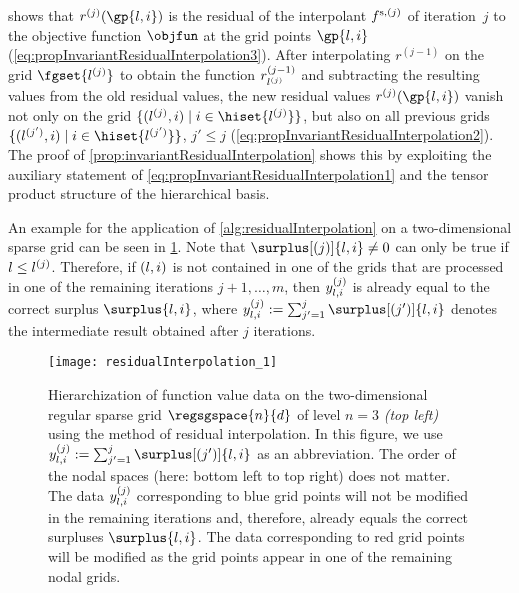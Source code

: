  shows that
$r^{(j)}(\gp{\*l,\*i})$ is the residual of the
interpolant $f^{\mathrm{s},(j)}$ of iteration~$j$
to the objective function $\objfun$ at the grid points $\gp{\*l,\*i}$
(\cref{eq:propInvariantResidualInterpolation3}).
After interpolating $r^{(j-1)}$ on the grid $\fgset{\*l^{(j)}}$
to obtain the function $r_{\*l^{(j)}}^{(j-1)}$
and subtracting the resulting values from the old residual values,
the new residual values $r^{(j)}(\gp{\*l,\*i})$ vanish
not only on the grid $\{(\*l^{(j)}, \*i) \mid \*i \in \hiset{\*l^{(j)}}\}$,
but also on all previous grids
$\{(\*l^{(j')}, \*i) \mid \*i \in \hiset{\*l^{(j')}}\}$, $j' \le j$
(\cref{eq:propInvariantResidualInterpolation2}).
The proof of \cref{prop:invariantResidualInterpolation}
shows this by exploiting the auxiliary statement of
\cref{eq:propInvariantResidualInterpolation1}
and the tensor product structure of the hierarchical basis.

An example for the application of \cref{alg:residualInterpolation}
on a two-dimensional sparse grid can be seen in
\cref{fig:residualInterpolation}.
Note that
$\surplus[(j)]{\*l,\*i} \not= 0$ can only be true if $\*l \le \*l^{(j)}$.
Therefore, if $(\*l, \*i)$ is not contained in one of the
grids that are processed in one of the remaining iterations $j+1, \dotsc, m$,
then $\linout[(j)]{\*l,\*i}$ is already equal to the correct surplus
$\surplus{\*l,\*i}$,
where $\linout[(j)]{\*l,\*i} := \sum_{j'=1}^j \surplus[(j')]{\*l,\*i}$
denotes the intermediate result obtained after $j$ iterations.

\begin{SCfigure}
  \texttt{[image: residualInterpolation\_1]}%
  \caption[%
    Hierarchization with residual interpolation%
  ]{%
    Hierarchization of function value data on the
    two-dimensional regular sparse grid
    $\regsgspace{n}{d}$ of level $n = 3$ \emph{(top left)}
    using the method of residual interpolation.
    In this figure, we use
    $\linout[(j)]{\*l,\*i} := \sum_{j'=1}^j \surplus[(j')]{\*l,\*i}$
    as an abbreviation.
    The order of the nodal spaces (here: bottom left to top right)
    does not matter.
    The data $\linout[(j)]{\*l,\*i}$
    corresponding to \textcolor{C0}{blue grid points}
    will not be modified in the remaining iterations
    and, therefore, already equals the correct surpluses $\surplus{\*l,\*i}$.
    The data corresponding to \textcolor{C1}{red grid points}
    will be modified as the grid points appear in one of the remaining
    nodal grids.%
  }%
  \label{fig:residualInterpolation}%
\end{SCfigure}
